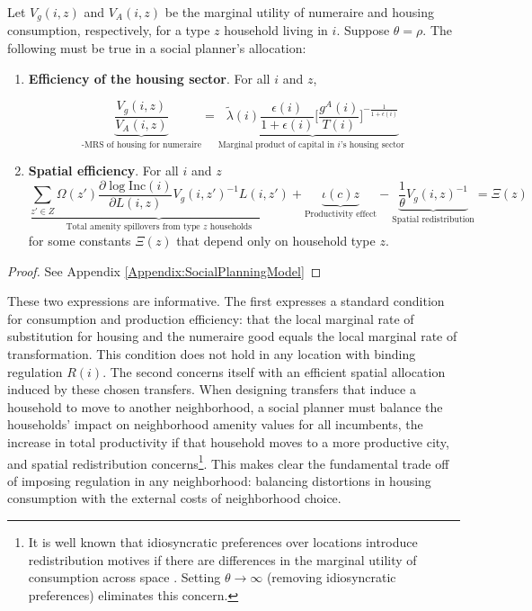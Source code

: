 \documentclass[12pt]{article}
\begin{document}
\begin{Proposition}\label{Prop:OptimalPolicy}
Let $V_{g}(i, z)$ and $V_{A}(i, z)$ be the marginal utility of numeraire and housing consumption, respectively, for a type $z$ household living in $i$. Suppose $\theta = \rho$. The following must be true in a social planner's allocation:
	
	\begin{enumerate}
		\item \textbf{Efficiency of the housing sector}. For all $i$ and $z$,
		
		\begin{equation*}
			\underbrace{\frac{V_{g}(i, z)}{V_{A}(i, z)}}_{\text{-MRS of housing for numeraire}} = 	\underbrace{ \tilde{\lambda}(i)\frac{\epsilon(i)}{1 + \epsilon(i)} \bigg[\frac{g^{A}(i)}{T(i)} \bigg]^{-\frac{1}{1 + \epsilon(i)}}}_{\text{Marginal product of capital in $i$'s housing sector }}
		\end{equation*}
		
		
		\item \textbf{Spatial efficiency}. For all $i$ and $z$
		\begin{equation*}
			\underbrace{\sum_{z' \in Z}\Omega(z')\frac{\partial \log \text{Inc}(i)}{\partial L(i, z)}V_{g}(i, z')^{-1}L(i, z')}_{\text{Total amenity spillovers from type $z$ households}} + \underbrace{\iota(c)z}_{\text{Productivity effect}} - \underbrace{\frac{1}{\theta}V_{g}(i, z)^{-1}}_{\text{Spatial redistribution}} = \Xi(z)
		\end{equation*}
		for some constants $\Xi(z)$ that depend only on household type $z$. 
	\end{enumerate}
	
	
\end{Proposition}
\begin{proof}
	See Appendix \ref{Appendix:SocialPlanningModel}
\end{proof}
These two expressions are informative. The first expresses a standard condition for consumption and production efficiency: that the local marginal rate of substitution for housing and the numeraire good equals the local marginal rate of transformation. This condition does not hold in any location with binding regulation $R(i)$. The second concerns itself with an efficient spatial allocation induced by these chosen transfers. When designing transfers that induce a household to move to another neighborhood, a social planner must balance the households' impact on neighborhood amenity values for all incumbents, the increase in total productivity if that household moves to a more productive city, and spatial redistribution concerns\footnote{It is well known that idiosyncratic preferences over locations introduce redistribution motives if there are differences in the marginal utility of consumption across space \citep{efficiency, DFM}. Setting $\theta \to \infty$ (removing idiosyncratic preferences) eliminates this concern.}. This makes clear the fundamental trade off of imposing regulation in any neighborhood: balancing distortions in housing consumption with the external costs of neighborhood choice.
\end{document}
